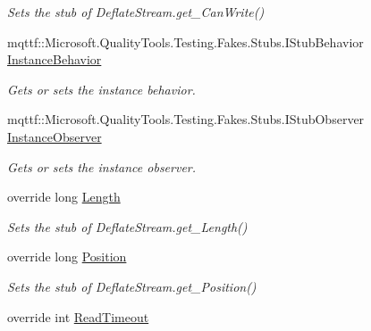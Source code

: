 \begin{DoxyCompactItemize}
\begin{DoxyCompactList}\small\item\em Sets the stub of Deflate\-Stream.\-get\-\_\-\-Can\-Write()\end{DoxyCompactList}\item 
mqttf\-::\-Microsoft.\-Quality\-Tools.\-Testing.\-Fakes.\-Stubs.\-I\-Stub\-Behavior \hyperlink{class_system_1_1_i_o_1_1_compression_1_1_fakes_1_1_stub_deflate_stream_ae721d1e944d96c95f39d1effc284ce5f}{Instance\-Behavior}
\begin{DoxyCompactList}\small\item\em Gets or sets the instance behavior.\end{DoxyCompactList}\item 
mqttf\-::\-Microsoft.\-Quality\-Tools.\-Testing.\-Fakes.\-Stubs.\-I\-Stub\-Observer \hyperlink{class_system_1_1_i_o_1_1_compression_1_1_fakes_1_1_stub_deflate_stream_a6ea20726feb7d2bc2a9b56c2b2e320dd}{Instance\-Observer}
\begin{DoxyCompactList}\small\item\em Gets or sets the instance observer.\end{DoxyCompactList}\item 
override long \hyperlink{class_system_1_1_i_o_1_1_compression_1_1_fakes_1_1_stub_deflate_stream_ac13ff4b0ef507f49fe320eae1ed7ad94}{Length}
\begin{DoxyCompactList}\small\item\em Sets the stub of Deflate\-Stream.\-get\-\_\-\-Length()\end{DoxyCompactList}\item 
override long \hyperlink{class_system_1_1_i_o_1_1_compression_1_1_fakes_1_1_stub_deflate_stream_ac69e67d36e9ded469f498f752c3ecefe}{Position}
\begin{DoxyCompactList}\small\item\em Sets the stub of Deflate\-Stream.\-get\-\_\-\-Position()\end{DoxyCompactList}\item 
override int \hyperlink{class_system_1_1_i_o_1_1_compression_1_1_fakes_1_1_stub_deflate_stream_a3b9ec10d2cebdff191a5854c3024906c}{Read\-Timeout}

\end{DoxyCompactItemize}
